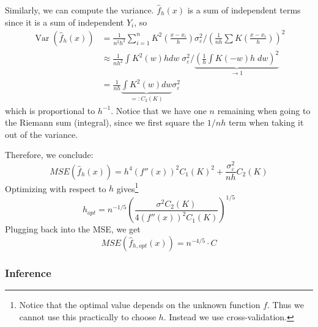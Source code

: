 \documentclass[11pt, %
	oneside, %
	english, %
	onehalfspacing, %
	]{article} %
\numberwithin{equation}{section}
\begin{document}
Similarly, we can compute the variance. $\hat{f}_h(x)$ is a sum of independent terms since it is a sum of independent $Y_i$, so
$$
\begin{aligned}
\operatorname{Var} \left( \hat{f}_h(x)\right) &=\frac{1}{n^2 h^2} \sum_{i=1}^n K^2\left(\frac{x-x_i}{h}\right)  \sigma_{\varepsilon}^2 /\left(\frac{1}{n h} \sum K\left(\frac{x-x_i}{h}\right)\right)^2 \\
&\approx \frac{1}{nh^2} \int K^2\left( w \right)h  d w \;\sigma^2_\varepsilon \Bigg/ \underbrace{ \left( \frac{1}{h} \int K(-w) h \;dw \right)^2  }_{ \to 1 } \\
&= \frac{1}{nh} \underbrace{ \int K^2(w) dw  }_{ =: C_2(K) }\sigma^2_\varepsilon
\end{aligned}
$$
which is proportional to $h^{-1}$. Notice that we have one $n$ remaining when going to the Riemann sum (integral), since we first square the $1 / nh$ term when taking it out of the variance.

Therefore, we conclude:
$$
MSE(\hat{f}_h(x)) = h^4 (f''(x))^2 C_1(K)^2 + \frac{\sigma^2_\varepsilon }{nh} C_2(K)
$$
Optimizing with respect to $h$ gives\footnote{Notice that the optimal value depends on the unknown function $f$. Thus we cannot use this practically to choose $h$. Instead we use cross-validation.}
$$
h_{opt} = n^{-1/5} \left( \frac{\sigma^2 C_2(K)}{4 (f''(x))^2 C_1(K)} \right)^{1/5}
$$
Plugging back into the MSE, we get
$$
MSE(\hat{f}_{h, opt}(x)) = n^{-4 / 5} \cdot C
$$


\subsubsection*{Inference}
\end{document}
